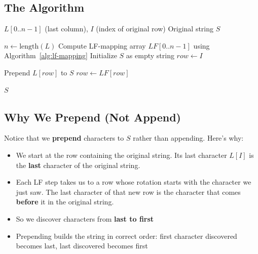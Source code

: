 \subsection*{The Algorithm}

\begin{algorithm}[H]
\caption{BWT Inversion}
\label{alg:bwt_inverse}
\begin{algorithmic}[1]
\Require \(L[0..n-1]\) (last column), \(I\) (index of original row)
\Ensure Original string \(S\)

\State \(n \gets \text{length}(L)\)
\State Compute LF-mapping array \(LF[0..n-1]\) using Algorithm~\ref{alg:lf-mapping}
\State Initialize \(S\) as empty string
\State \(row \gets I\)

    \State Prepend \(L[row]\) to \(S\) 
    \State \(row \gets LF[row]\) 
\EndFor

\State \Return \(S\)
\end{algorithmic}
\end{algorithm}

\subsection*{Why We Prepend (Not Append)}

Notice that we \textbf{prepend} characters to \(S\) rather than appending. Here's why:

\begin{itemize}
    \item We start at the row containing the original string. Its last character \(L[I]\) is the \textbf{last} character of the original string.
    \item Each LF step takes us to a row whose rotation starts with the character we just saw. The last character of that new row is the character that comes \textbf{before} it in the original string.
    \item So we discover characters from \textbf{last to first}
    \item Prepending builds the string in correct order: first character discovered becomes last, last discovered becomes first
\end{itemize}

